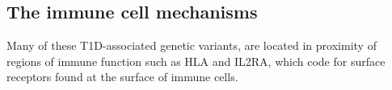 


\subsection{The immune cell mechanisms}

Many of these T1D-associated genetic variants, are located in proximity of regions of immune function such as HLA and IL2RA, which code for surface receptors
found at the surface of immune cells.

